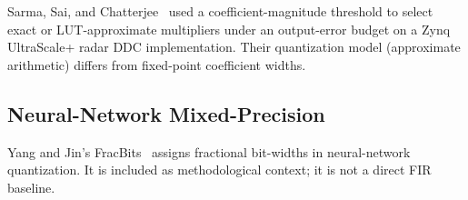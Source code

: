 Sarma, Sai, and Chatterjee~\cite{sarma2026coefficient} used a
coefficient-magnitude threshold to select exact or LUT-approximate
multipliers under an output-error budget on a Zynq UltraScale+ radar DDC
implementation. Their quantization model (approximate arithmetic)
differs from fixed-point coefficient widths.

\subsection{Neural-Network Mixed-Precision}

Yang and Jin's FracBits~\cite{yang2021fracbits} assigns fractional
bit-widths in neural-network quantization. It is included as
methodological context; it is not a direct FIR baseline.
